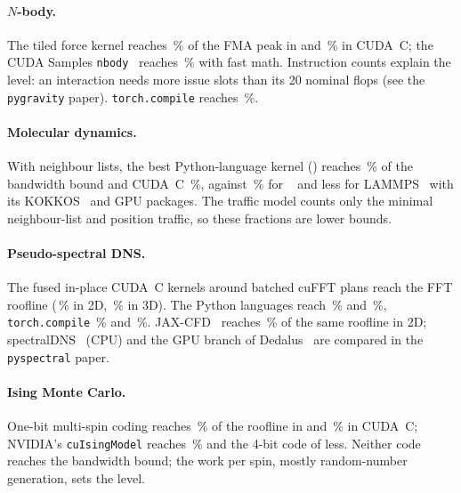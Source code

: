 \documentclass[11pt]{article}
\begin{document}
\paragraph{$N$-body.} The tiled force kernel reaches \NbodyDslPct\,\% of the FMA peak in
\NbodyDslBackend{} and \NbodyCudaPct\,\% in CUDA~C; the CUDA Samples \texttt{nbody}~\citep{nyland2007,
cudasamples} reaches \NbodyCpPct\,\% with fast math. Instruction counts explain the level: an
interaction needs more issue slots than its 20 nominal flops (see the \texttt{pygravity} paper).
\texttt{torch.compile} reaches \NbodyCompilePct\,\%.

\paragraph{Molecular dynamics.} With neighbour lists, the best Python-language kernel
(\MdDslBackend) reaches \MdDslPct\,\% of the bandwidth bound and CUDA~C \MdCudaPct\,\%, against
\MdCpPct\,\% for \MdCpCode~\citep{anderson2020hoomd} and less for LAMMPS~\citep{thompson2022lammps}
with its KOKKOS~\citep{trott2022kokkos} and GPU packages. The traffic model counts only the
minimal neighbour-list and position traffic, so these fractions are lower bounds.

\paragraph{Pseudo-spectral DNS.} The fused in-place CUDA~C kernels around batched cuFFT plans
reach the FFT roofline (\SpecTwoCudaPct\,\% in 2D, \SpecThreeCudaPct\,\% in 3D). The Python
languages reach \SpecTwoDslPct\,\% and \SpecThreeDslPct\,\%, \texttt{torch.compile}
\SpecTwoCompilePct\,\% and \SpecThreeCompilePct\,\%. JAX-CFD~\citep{dresdner2022learning} reaches
\SpecTwoCpPct\,\% of the same roofline in 2D; spectralDNS~\citep{mortensen2016high} (CPU) and the
GPU branch of Dedalus~\citep{burns2020dedalus} are compared in the \texttt{pyspectral} paper.

\paragraph{Ising Monte Carlo.} One-bit multi-spin coding reaches \IsingDslPct\,\% of the roofline
in \IsingDslBackend{} and \IsingCudaPct\,\% in CUDA~C; NVIDIA's \texttt{cuIsingModel}
\citep{Bisson2025,IsingGPURepo} reaches \IsingCpPct\,\% and the 4-bit code of
\citet{Romero2020} less. Neither code reaches the bandwidth bound; the work per spin, mostly
random-number generation, sets the level.
\end{document}
